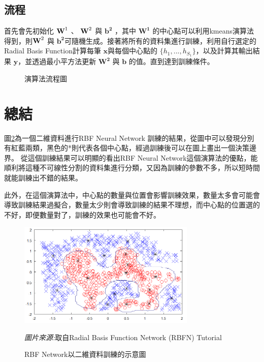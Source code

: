 \subsection{流程}

首先會先初始化 \(\textbf W^1\)  、 \(\textbf W^2\) 與 \(\mathbf{b^2}\) ，其中 \(\mathbf{W^1}\) 的中心點可以利用kmeans演算法得到，則\(\textbf W^2\) 與 \(\mathbf{b^2}\)可隨機生成。接著將所有的資料集進行訓練，利用自行選定的Radial Basis Function計算每筆 \(\mathbf x\)與每個中心點的 \(\{h_1,...,h_{S_1}\}\)，以及計算其輸出結果 \(\mathbf{y}\)，並透過最小平方法更新 \(\mathbf{W^2}\) 與 \(\mathbf{b}\) 的值。直到達到訓練條件。

\begin{figure}[H]
	\centering
	
	\caption{演算法流程圖}
	\label{fig:AlogrithmWorkflow}
\end{figure}

\section {總結}
圖\ref{fig:RbfOutcome}為一個二維資料進行RBF Neural Network 訓練的結果，從圖中可以發現分別有紅藍兩類，黑色的*則代表各個中心點，經過訓練後可以在圖上畫出一個決策邊界。
從這個訓練結果可以明顯的看出RBF Neural Network這個演算法的優點，能順利將這種不可線性分割的資料集進行分類，又因為訓練的參數不多，所以短時間就能訓練出不錯的結果。

此外，在這個演算法中，中心點的數量與位置會影響訓練效果，數量太多會可能會導致訓練結果過擬合，數量太少則會導致訓練的結果不理想，而中心點的位置選的不好，即便數量對了，訓練的效果也可能會不好。




\begin{figure}[h]
	\centering
	\includegraphics[height=5cm]{./pic/v35Qta6w.png}
	\caption{RBF Network以二維資料訓練的示意圖}

	\begin{minipage}{.7\linewidth}
		\centering
		\footnotesize
		\emph{圖片來源:}取自Radial Basis Function Network (RBFN) Tutorial
	\end{minipage}

	\label{fig:RbfOutcome}
\end{figure}
